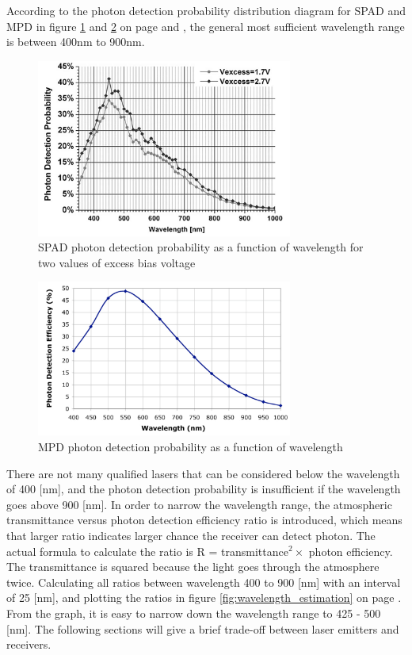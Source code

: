 According to the photon detection probability distribution diagram for \acs{SPAD} and \acs{MPD} in figure \ref{fig:SPAD_efficiency} and \ref{fig:MPD_efficiency} on page \pageref{fig:SPAD_efficiency} and \pageref{fig:MPD_efficiency}, the general most sufficient wavelength range is between 400nm to 900nm. 

\begin{figure}[ht!]
\centering
\includegraphics[width=0.75\textwidth]{chapters/img/SPAD_efficiency.png}
\caption{\acs{SPAD} photon detection probability as a function of wavelength for two values of excess bias voltage}
\label{fig:SPAD_efficiency}
\end{figure}

\begin{figure}[ht!]
\centering
\includegraphics[width=0.75\textwidth]{chapters/img/MPD_efficiency.png}
\caption{\acs{MPD} photon detection probability as a function of wavelength}
\label{fig:MPD_efficiency}
\end{figure}

There are not many qualified \acs{laser}s that can be considered below the wavelength of 400 [nm], and the photon detection probability is insufficient if the wavelength goes above 900 [nm]. In order to narrow the wavelength range, the atmospheric transmittance versus photon detection efficiency ratio is introduced, which means that larger ratio indicates larger chance the receiver can detect photon. The actual formula to calculate the ratio is R = transmittance$^{2} \times$ photon efficiency. The transmittance is squared because the light goes through the atmosphere twice. Calculating all ratios between wavelength 400 to 900 [nm] with an interval of 25 [nm], and plotting the ratios in figure \ref{fig:wavelength_estimation} on page \pageref{fig:wavelength_estimation}. From the graph, it is easy to narrow down the wavelength range to 425 - 500 [nm].  The following sections will give a brief trade-off between \acs{laser} emitters and receivers.

